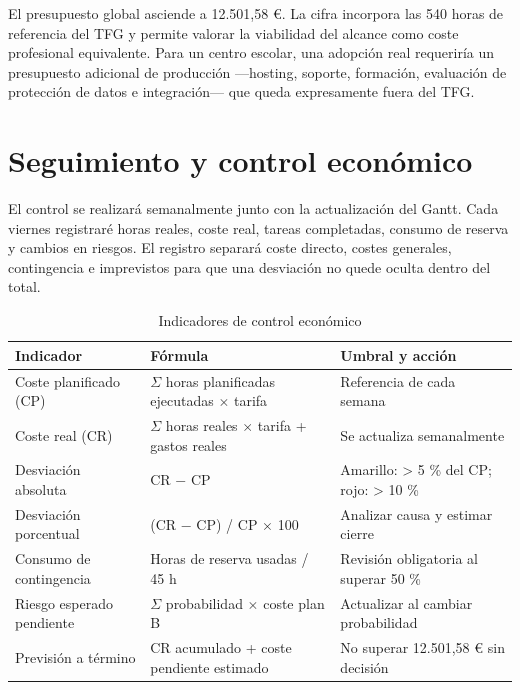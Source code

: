 El presupuesto global asciende a 12.501,58 €. La cifra incorpora las 540 horas de referencia del TFG y permite valorar la viabilidad del alcance como coste profesional equivalente. Para un centro escolar, una adopción real requeriría un presupuesto adicional de producción —hosting, soporte, formación, evaluación de protección de datos e integración— que queda expresamente fuera del TFG.

\section{Seguimiento y control económico}\label{sec:3-3}

El control se realizará semanalmente junto con la actualización del Gantt. Cada viernes registraré horas reales, coste real, tareas completadas, consumo de reserva y cambios en riesgos. El registro separará coste directo, costes generales, contingencia e imprevistos para que una desviación no quede oculta dentro del total.

\begin{table}[H]
\centering\small
\begin{tabularx}{\textwidth}{>{\hsize=0.819\hsize\raggedright\arraybackslash}X>{\hsize=1.043\hsize\raggedright\arraybackslash}X>{\hsize=1.138\hsize\raggedright\arraybackslash}X}
\toprule
\rowcolor{cabeceratabla} \textbf{Indicador} & \textbf{Fórmula} & \textbf{Umbral y acción} \\
\midrule
Coste planificado (CP) & $\Sigma$ horas planificadas ejecutadas $\times$ tarifa & Referencia de cada semana \\
Coste real (CR) & $\Sigma$ horas reales $\times$ tarifa + gastos reales & Se actualiza semanalmente \\
Desviación absoluta & CR $-$ CP & Amarillo: \textgreater{} 5 \% del CP; rojo: \textgreater{} 10 \% \\
Desviación porcentual & (CR $-$ CP) / CP $\times$ 100 & Analizar causa y estimar cierre \\
Consumo de contingencia & Horas de reserva usadas / 45 h & Revisión obligatoria al superar 50 \% \\
Riesgo esperado pendiente & $\Sigma$ probabilidad $\times$ coste plan B & Actualizar al cambiar probabilidad \\
Previsión a término & CR acumulado + coste pendiente estimado & No superar 12.501,58 € sin decisión \\
\bottomrule
\end{tabularx}
\caption{Indicadores de control económico}\label{tab:22}
\end{table}

